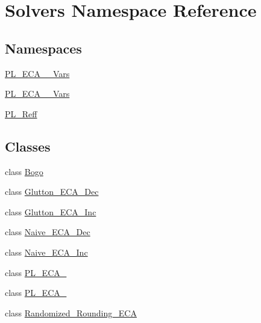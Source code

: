 \hypertarget{namespace_solvers}{}\section{Solvers Namespace Reference}
\label{namespace_solvers}
\subsection*{Namespaces}
\begin{DoxyCompactItemize}
\item 
 \hyperlink{namespace_solvers_1_1_p_l___e_c_a__2___vars}{P\+L\+\_\+\+E\+C\+A\+\_\+\_\+\+Vars}
\item 
 \hyperlink{namespace_solvers_1_1_p_l___e_c_a__3___vars}{P\+L\+\_\+\+E\+C\+A\+\_\+\_\+\+Vars}
\item 
 \hyperlink{namespace_solvers_1_1_p_l___reff}{P\+L\+\_\+\+Reff}
\end{DoxyCompactItemize}
\subsection*{Classes}
\begin{DoxyCompactItemize}
\item 
class \hyperlink{class_solvers_1_1_bogo}{Bogo}
\item 
class \hyperlink{class_solvers_1_1_glutton___e_c_a___dec}{Glutton\+\_\+\+E\+C\+A\+\_\+\+Dec}
\item 
class \hyperlink{class_solvers_1_1_glutton___e_c_a___inc}{Glutton\+\_\+\+E\+C\+A\+\_\+\+Inc}
\item 
class \hyperlink{class_solvers_1_1_naive___e_c_a___dec}{Naive\+\_\+\+E\+C\+A\+\_\+\+Dec}
\item 
class \hyperlink{class_solvers_1_1_naive___e_c_a___inc}{Naive\+\_\+\+E\+C\+A\+\_\+\+Inc}
\item 
class \hyperlink{class_solvers_1_1_p_l___e_c_a__2}{P\+L\+\_\+\+E\+C\+A\+\_}
\item 
class \hyperlink{class_solvers_1_1_p_l___e_c_a__3}{P\+L\+\_\+\+E\+C\+A\+\_}
\item 
class \hyperlink{class_solvers_1_1_randomized___rounding___e_c_a}{Randomized\+\_\+\+Rounding\+\_\+\+E\+CA}
\end{DoxyCompactItemize}
